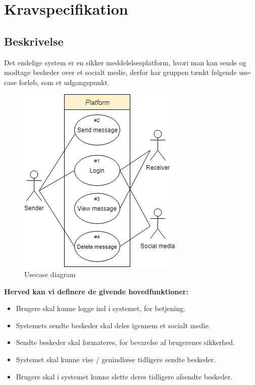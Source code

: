 \section{Kravspecifikation}
\subsection{Beskrivelse}
Det endelige system er en sikker meddelelsesplatform, hvori man kan sende og modtage beskeder over et socialt medie, derfor har gruppen tænkt følgende use-case forløb, som et udgangspunkt.

\begin{table}[H]
    \begin{minipage}{.5\textwidth}
        \begin{figure}[H]
            \centering
            \includegraphics[width=0.85\linewidth]{Projectdoc/Assets/Illustrationer/simple-usecase.png}
            \caption{Usecase diagram}
            \label{fig:usecase}
        \end{figure}
    \end{minipage}
    \begin{minipage}{.5\textwidth}
        \textbf{Herved kan vi definere de givende hovedfunktioner:}
        \begin{itemize}
            \item Brugere skal kunne logge ind i systemet, for betjening.
            \item Systemets sendte beskeder skal deles igennem et socialt medie.
            \item Sendte beskeder skal formateres, for bevarelse af brugerenes sikkerhed.
            \item Systemet skal kunne vise / genindlæse tidligere sendte beskeder.
            \item Brugere skal i systemet kunne slette deres tidligere afsendte beskeder.
        \end{itemize}
    \end{minipage}
\end{table}

